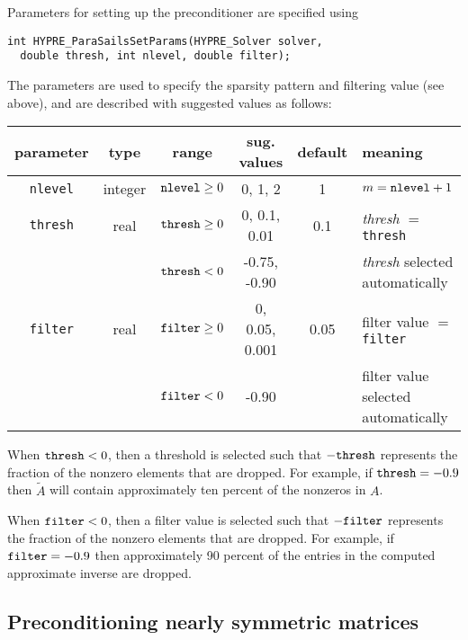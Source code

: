 Parameters for setting up the preconditioner are specified using
\begin{display}
\begin{verbatim}
int HYPRE_ParaSailsSetParams(HYPRE_Solver solver, 
  double thresh, int nlevel, double filter);
\end{verbatim}
\end{display}

The parameters are used to specify the sparsity pattern and filtering value
(see above), and are described with suggested values as follows:

\begin{center}
\begin{tabular}{|c|c|c|c|c|l|} \hline
parameter    & type    & range                & sug. values  & default & meaning \\ \hline
{\tt nlevel} & integer & ${\tt nlevel} \ge 0$ & 0, 1, 2      & 1   & $m={\tt nlevel}+1$\\
\hline
{\tt thresh} & real    & ${\tt thresh} \ge 0$ & 0, 0.1, 0.01 & 0.1 & {\em thresh} $=$ {\tt thresh}\\
             &         & ${\tt thresh}  <  0$ & -0.75, -0.90 &     & {\em thresh} selected automatically\\
\hline
{\tt filter} & real    & ${\tt filter} \ge 0$ & 0, 0.05, 0.001 & 0.05 & filter value $=$ {\tt filter}\\
             &         & ${\tt filter}  <  0$ & -0.90        &     & filter value selected automatically\\
\hline
\end{tabular}
\end{center}

When ${\tt thresh} < 0$, then a threshold is selected such that 
$-{\tt thresh}$ represents the fraction of the nonzero elements
that are dropped.  For example, if ${\tt thresh} = -0.9$ then
$\tilde{A}$ will contain approximately ten percent of the nonzeros
in $A$.

When ${\tt filter} < 0$, then a filter value is selected such that 
$-{\tt filter}$ represents the fraction of the nonzero elements
that are dropped.  For example, if ${\tt filter} = -0.9$ then
approximately 90 percent of the entries in the computed approximate 
inverse are dropped.


\subsection{Preconditioning nearly symmetric matrices}
\label{nearly}

